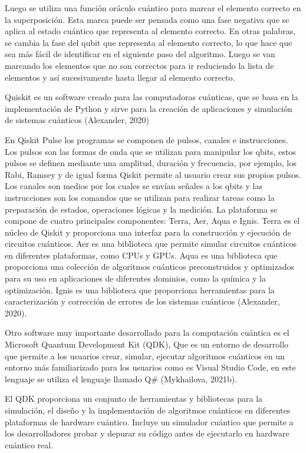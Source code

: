 \documentclass{article}
\begin{document}
Luego se utiliza una función oráculo cuántico para marcar el elemento correcto en la superposición. Esta marca puede ser pensada como una fase negativa que se aplica al estado cuántico que representa al elemento correcto. En otras palabras, se cambia la fase del qubit que representa al elemento correcto, lo que hace que sea más fácil de identificar en el siguiente paso del algoritmo. Luego se van marcando los elementos que no son correctos para ir reduciendo la lista de elementos y así sucesivamente hasta llegar al elemento correcto. 

Quiskit es un software creado para las computadoras cuánticas, que se basa en la implementación de Python y sirve para la creación de aplicaciones y simulación de sistemas cuánticos (Alexander, 2020)

En Qiskit Pulse los programas se componen de pulsos, canales e instrucciones. Los pulsos son las formas de onda que se utilizan para manipular los qbits, estos pulsos se definen mediante una amplitud, duración y frecuencia, por ejemplo, los Rabi, Ramsey y de igual forma Qiskit permite al usuario crear sus propios pulsos. Los canales son medios por los cuales se envían señales a los qbits y las instrucciones son los comandos que se utilizan para realizar tareas como la preparación de estados, operaciones lógicas y la medición.
La plataforma se compone de cuatro principales componentes: Terra, Aer, Aqua e Ignis. Terra es el núcleo de Qiskit y proporciona una interfaz para la construcción y ejecución de circuitos cuánticos. Aer es una biblioteca que permite simular circuitos cuánticos en diferentes plataformas, como CPUs y GPUs. Aqua es una biblioteca que proporciona una colección de algoritmos cuánticos preconstruidos y optimizados para su uso en aplicaciones de diferentes dominios, como la química y la optimización. Ignis es una biblioteca que proporciona herramientas para la caracterización y corrección de errores de los sistemas cuánticos (Alexander, 2020). 

Otro software muy importante desarrollado para la computación cuántica es el Microsoft Quantum Development Kit (QDK), Que es un entorno de desarrollo que permite a los usuarios crear, simular, ejecutar algoritmos cuánticos en un entorno más familiarizado para los usuarios como es Visual Studio Code, en este lenguaje se utiliza el lenguaje llamado Q\# (Mykhailova, 2021b).

El QDK proporciona un conjunto de herramientas y bibliotecas para la simulación, el diseño y la implementación de algoritmos cuánticos en diferentes plataformas de hardware cuántico. Incluye un simulador cuántico que permite a los desarrolladores probar y depurar su código antes de ejecutarlo en hardware cuántico real. 
\end{document}
